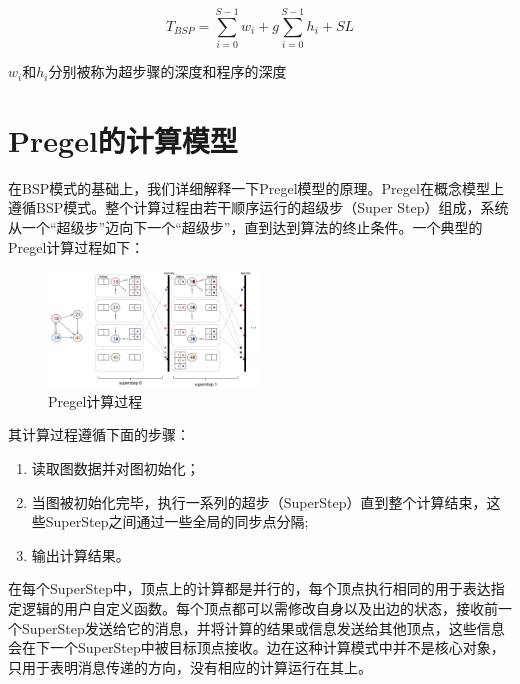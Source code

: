 \documentclass[10pt,a4paper,twocolumn,twoside,UTF8]{ctexart}
\begin{document}
		\begin{equation}
		T_{BSP} = \sum\limits_{i = 0}^{S-1} w_i  + g\sum\limits_{i = 0}^{S-1}h_i + SL  
		\end{equation}
	
	$w_i$和$h_i$分别被称为超步骤的深度和程序的深度



\section{Pregel的计算模型}
	在BSP模式的基础上，我们详细解释一下Pregel模型的原理。Pregel在概念模型上遵循BSP模式。整个计算过程由若干顺序运行的超级步（Super Step）组成，系统从一个“超级步”迈向下一个“超级步”，直到达到算法的终止条件。一个典型的Pregel计算过程如下：
	\begin{figure}[htbp]
		\centering
		\includegraphics[width=0.5\textwidth]{img//pic2.png}
		\caption{Pregel计算过程}
		\label{pic2}
	\end{figure}
	其计算过程遵循下面的步骤：
	\begin{enumerate}[(1)]
		\item 读取图数据并对图初始化；
		\item 当图被初始化完毕，执行一系列的超步（SuperStep）直到整个计算结束，这些SuperStep之间通过一些全局的同步点分隔;
	 	\item 输出计算结果。
	\end{enumerate}
	
	在每个SuperStep中，顶点上的计算都是并行的，每个顶点执行相同的用于表达指定逻辑的用户自定义函数。每个顶点都可以需修改自身以及出边的状态，接收前一个SuperStep发送给它的消息，并将计算的结果或信息发送给其他顶点，这些信息会在下一个SuperStep中被目标顶点接收。边在这种计算模式中并不是核心对象，只用于表明消息传递的方向，没有相应的计算运行在其上。
		
\end{document}
